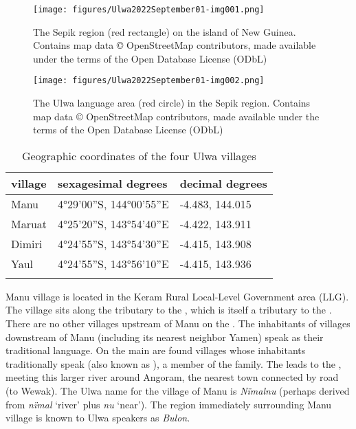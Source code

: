 \begin{figure}
\caption{The Sepik region (red rectangle) on the island of New Guinea. Contains map data © OpenStreetMap contributors, made available under the terms of the Open Database License (ODbL)}
\label{fig:1.1}
\texttt{[image: figures/Ulwa2022September01-img001.png]}
\end{figure}

\begin{figure}
\caption{The Ulwa language area (red circle) in the Sepik region. Contains map data © OpenStreetMap contributors, made available under the terms of the Open Database License (ODbL)}
\label{fig:1.2}
\texttt{[image: figures/Ulwa2022September01-img002.png]}
\end{figure}

\begin{table}
\caption{Geographic coordinates of the four Ulwa villages}
\label{tab:1.1a}


\begin{tabular}{lll}
\lsptoprule
village & sexagesimal degrees & decimal degrees\\
\midrule
Manu & 4°29’00”S, 144°00’55”E & -4.483, 144.015\\
Maruat & 4°25’20”S, 143°54’40”E & -4.422, 143.911\\
Dimiri & 4°24’55”S, 143°54’30”E & -4.415, 143.908\\
Yaul & 4°24’55”S, 143°56’10”E & -4.415, 143.936\\
\lspbottomrule
\end{tabular}
\end{table}

Manu village is located in the Keram Rural Local-Level Government area (LLG). The village sits along the  tributary to the , which is itself a tributary to the . There are no other villages upstream of Manu on the . The inhabitants of villages downstream of Manu (including its nearest neighbor Yamen) speak  as their traditional language. On the main  are found villages whose inhabitants traditionally speak  (also known as ), a member of the  family. The  leads to the , meeting this larger river around \linebreak Angoram, the nearest town connected by road (to Wewak). The Ulwa name for the village of Manu is \textit{Nïmalnu} (perhaps derived from \textit{nïmal} ‘river’ plus \textit{nu} ‘near’). The region immediately surrounding Manu village is known to Ulwa speakers as \textit{Bulon}.

